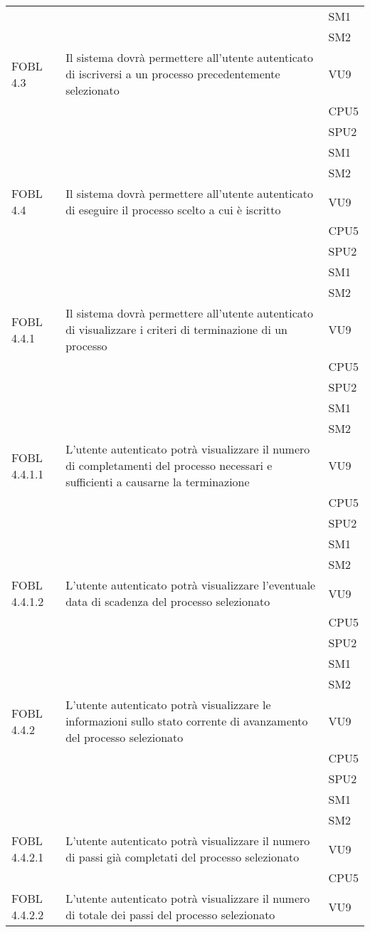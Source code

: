 \begin{longtable}{lXl}
&&SM1\\
&&SM2\\
\midrule
FOBL 4.3&Il sistema dovrà permettere all'utente autenticato di iscriversi a un processo precedentemente selezionato&VU9\\
&&CPU5\\
&&SPU2\\
&&SM1\\
&&SM2\\
\midrule
FOBL 4.4&Il sistema dovrà permettere all'utente autenticato di eseguire il processo scelto a cui è iscritto&VU9\\
&&CPU5\\
&&SPU2\\
&&SM1\\
&&SM2\\
\midrule
FOBL 4.4.1&Il sistema dovrà permettere all'utente autenticato di visualizzare i criteri di terminazione di un processo&VU9\\
&&CPU5\\
&&SPU2\\
&&SM1\\
&&SM2\\
\midrule
FOBL 4.4.1.1&L'utente autenticato potrà visualizzare il numero di completamenti del processo necessari e sufficienti a causarne la terminazione&VU9\\
&&CPU5\\
&&SPU2\\
&&SM1\\
&&SM2\\
\midrule
FOBL 4.4.1.2&L'utente autenticato potrà visualizzare l'eventuale data di scadenza del processo selezionato&VU9\\
&&CPU5\\
&&SPU2\\
&&SM1\\
&&SM2\\
\midrule
FOBL 4.4.2&L'utente autenticato potrà visualizzare le informazioni sullo stato corrente di avanzamento del processo selezionato&VU9\\
&&CPU5\\
&&SPU2\\
&&SM1\\
&&SM2\\
\midrule
FOBL 4.4.2.1&L'utente autenticato potrà visualizzare il numero di passi già completati del processo selezionato&VU9\\
&&CPU5\\
\midrule
FOBL 4.4.2.2&L'utente autenticato potrà visualizzare il numero di totale dei passi del processo selezionato&VU9\\

\end{longtable}
